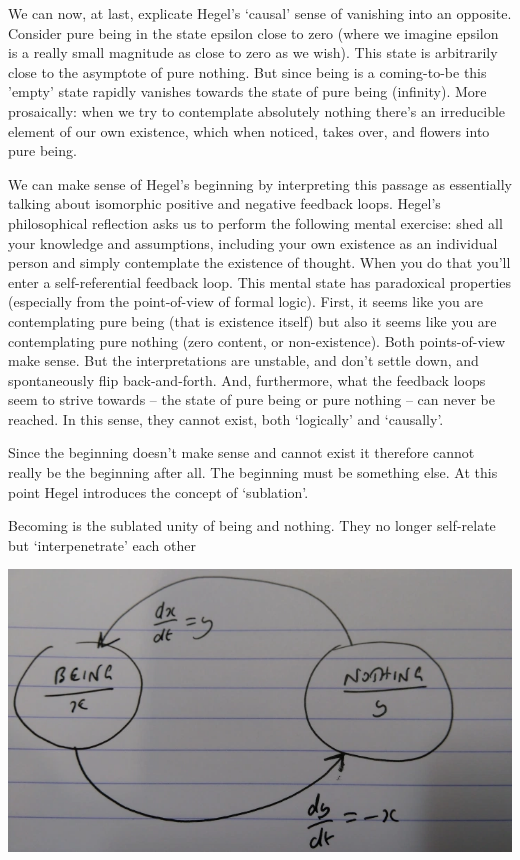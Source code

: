 \documentclass[
]{book}
\begin{document}
We can now, at last, explicate Hegel's `causal' sense of vanishing into an opposite. Consider pure being in the state epsilon close to zero (where we imagine epsilon is a really small magnitude as close to zero as we wish). This state is arbitrarily close to the asymptote of pure nothing. But since being is a coming-to-be this 'empty' state rapidly vanishes towards the state of pure being (infinity). More prosaically: when we try to contemplate absolutely nothing there's an irreducible element of our own existence, which when noticed, takes over, and flowers into pure being.

We can make sense of Hegel's beginning by interpreting this passage as essentially talking about isomorphic positive and negative feedback loops.
Hegel's philosophical reflection asks us to perform the following mental exercise: shed all your knowledge and assumptions, including your own existence as an individual person and simply contemplate the existence of thought. When you do that you'll enter a self-referential feedback loop. This mental state has paradoxical properties (especially from the point-of-view of formal logic). First, it seems like you are contemplating pure being (that is existence itself) but also it seems like you are contemplating pure nothing (zero content, or non-existence). Both points-of-view make sense. But the interpretations are unstable, and don't settle down, and spontaneously flip back-and-forth. And, furthermore, what the feedback loops seem to strive towards -- the state of pure being or pure nothing -- can never be reached. In this sense, they cannot exist, both `logically' and `causally'.

Since the beginning doesn't make sense and cannot exist it therefore cannot really be the beginning after all. The beginning must be something else. At this point Hegel introduces the concept of `sublation'.

Becoming is the sublated unity of being and nothing. They no longer self-relate but `interpenetrate' each other

\includegraphics{fig/wright_hegel.png}
\end{document}
